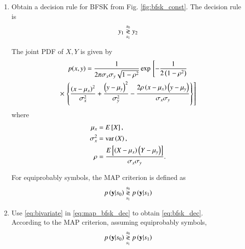\documentclass[journal,12pt,twocolumn]{IEEEtran}
\renewcommand\thesection{\arabic{section}}
\begin{document}
\begin{enumerate}[label=\thesection.\arabic*.,ref=\thesection.\theenumi]
\item
Obtain a decision rule for BFSK from Fig. \ref{fig:bfsk_const}.
\solution The decision rule is
\begin{equation}
\label{eq:bfsk_dec}
y_1 \overset{s_0}{\underset{s_1}{\gtrless}} y_2
\end{equation}
\begin{definition}
The joint PDF of $X,Y$ is given by
{\small
\begin{multline}
\label{eq:bivariate}
p(x,y)= \frac{1}{2\pi \sigma_x\sigma_y\sqrt{1-\rho^2}}\exp{}\left[-\frac{1}{2\left(1-\rho^2\right)}\right.
\\
\times {}\left.\left\{\frac{\left(x-\mu_x\right)^2}{\sigma_x^2}+\frac{\left(y-\mu_y\right)^2}{\sigma_y^2}-\frac{2\rho\left(x-\mu_x\right)\left(y-\mu_y\right)}{\sigma_x\sigma_y}\right\}\right]
\end{multline}
}
%
where
\begin{align}
\mu_x &= E{}\left[X\right],
\\
\sigma_x^2 &= \text{var}\left(X\right),
\\
\rho &= \frac{E{}\left[\left(X - \mu_x\right)\left(Y-\mu_y\right)\right]}{\sigma_x\sigma_y}.
\end{align}
%
\end{definition}
%

For equiprobably symbols, the MAP criterion is defined as
%
\begin{equation}
\label{eq:map_bfsk_dec}
p\left(\mathbf{y}|s_0\right) \overset{s_0}{\underset{s_1}{\gtrless}} p\left(\mathbf{y}|s_1\right)
\end{equation}
\item
Use \eqref{eq:bivariate} in \eqref{eq:map_bfsk_dec}  to obtain \eqref{eq:bfsk_dec}.
\\
\solution According to the MAP criterion, assuming equiprobably symbols,
\begin{align}
p\left(\mathbf{y}|s_0\right) \overset{s_0}{\underset{s_1}{\gtrless}} p\left(\mathbf{y}|s_1\right)
\end{align}


\end{enumerate}
\end{document}
